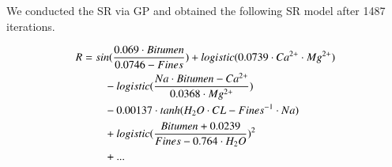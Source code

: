 \documentclass[final,5p,times,twocolumn]{elsarticle}
\begin{document}

We conducted the SR via GP and obtained the following SR model after 1487 iterations.



%

\begin{align} \label{eq:NIRS}
\notag  R &= sin (\frac{0.069 \cdot Bitumen}{0.0746 - Fines})  + logistic(0.0739 \cdot Ca^{2+} \cdot Mg^{2+} )\\\notag
&\qquad - logistic(\frac{Na  \cdot Bitumen - Ca^{2+} }{0.0368 \cdot Mg^{2+}})\\\notag
&\qquad - 0.00137 \cdot tanh(H_2O \cdot CL - Fines^{-1} \cdot Na) \\\notag
&\qquad + logistic(\frac{Bitumen + 0.0239}{ Fines - 0.764 \cdot H_2O} )^2\\\notag 
&\qquad + ...\\
\end{align}
\end{document}
